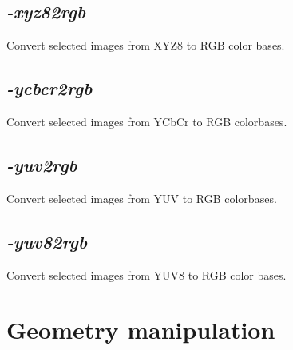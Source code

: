 \documentclass[a4paper,11pt,twoside]{book}
\begin{document}
\subsection{\emph{-xyz82rgb} }\vspace*{-0.5em}
Convert selected images from XYZ8 to RGB color bases.


\subsection{\emph{-ycbcr2rgb} }\vspace*{-0.5em}
Convert selected images from YCbCr to RGB colorbases.


\subsection{\emph{-yuv2rgb} }\vspace*{-0.5em}
Convert selected images from YUV to RGB colorbases.


\subsection{\emph{-yuv82rgb} }\vspace*{-0.5em}
Convert selected images from YUV8 to RGB color bases.

\section{Geometry manipulation}
\end{document}
